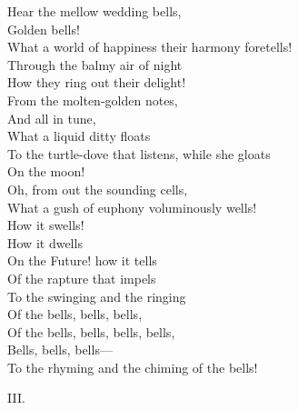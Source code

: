 \documentclass[fontsize=9, a5paper]{scrbook}
\begin{document}
\begin{poem}
\begin{stanza}
        \verseindent Hear the mellow wedding bells,\\
                 \verseindent\verseindent\verseindent  Golden bells!\\
What a world of happiness their harmony foretells!\\
        \verseindent Through the balmy air of night\\
        \verseindent How they ring out their delight!\\
           \verseindent\verseindent From the molten-golden notes,\\
               \verseindent\verseindent\verseindent And all in tune,\\
           \verseindent \verseindent What a liquid ditty floats\\
    \verseindent To the turtle-dove that listens, while she gloats\\
               \verseindent \verseindent\verseindent On the moon!\\
         \verseindent Oh, from out the sounding cells,\\
What a gush of euphony voluminously wells!\\
               \verseindent\verseindent\verseindent How it swells!\\
               \verseindent\verseindent\verseindent How it dwells\\
           \verseindent\verseindent On the Future! how it tells\\
           \verseindent\verseindent Of the rapture that impels\\
         \verseindent To the swinging and the ringing\\
           \verseindent\verseindent\verseindent Of the bells, bells, bells,\\
         \verseindent\verseindent Of the bells, bells, bells, bells,\\
               \verseindent\verseindent\verseindent Bells, bells, bells—\\
  To the rhyming and the chiming of the bells!
\end{stanza}
\pagebreak
\begin{stanza}
III.


\end{stanza}
\end{poem}
\end{document}
